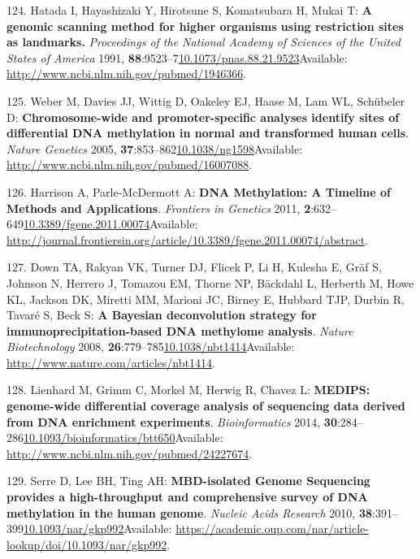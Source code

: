 \documentclass[
]{book}
\begin{document}
\leavevmode\hypertarget{ref-Hatada1991}{}%
124. Hatada I, Hayashizaki Y, Hirotsune S, Komatsubara H, Mukai T: \textbf{A genomic scanning method for higher organisms using restriction sites as landmarks.} \emph{Proceedings of the National Academy of Sciences of the United States of America} 1991, \textbf{88}:9523--7\href{https://doi.org/10.1073/pnas.88.21.9523}{10.1073/pnas.88.21.9523}Available: \url{http://www.ncbi.nlm.nih.gov/pubmed/1946366}.

\leavevmode\hypertarget{ref-Weber2005}{}%
125. Weber M, Davies JJ, Wittig D, Oakeley EJ, Haase M, Lam WL, Schübeler D: \textbf{Chromosome-wide and promoter-specific analyses identify sites of differential DNA methylation in normal and transformed human cells}. \emph{Nature Genetics} 2005, \textbf{37}:853--862\href{https://doi.org/10.1038/ng1598}{10.1038/ng1598}Available: \url{http://www.ncbi.nlm.nih.gov/pubmed/16007088}.

\leavevmode\hypertarget{ref-Harrison2011}{}%
126. Harrison A, Parle-McDermott A: \textbf{DNA Methylation: A Timeline of Methods and Applications}. \emph{Frontiers in Genetics} 2011, \textbf{2}:632--649\href{https://doi.org/10.3389/fgene.2011.00074}{10.3389/fgene.2011.00074}Available: \url{http://journal.frontiersin.org/article/10.3389/fgene.2011.00074/abstract}.

\leavevmode\hypertarget{ref-Down2009}{}%
127. Down TA, Rakyan VK, Turner DJ, Flicek P, Li H, Kulesha E, Gräf S, Johnson N, Herrero J, Tomazou EM, Thorne NP, Bäckdahl L, Herberth M, Howe KL, Jackson DK, Miretti MM, Marioni JC, Birney E, Hubbard TJP, Durbin R, Tavaré S, Beck S: \textbf{A Bayesian deconvolution strategy for immunoprecipitation-based DNA methylome analysis}. \emph{Nature Biotechnology} 2008, \textbf{26}:779--785\href{https://doi.org/10.1038/nbt1414}{10.1038/nbt1414}Available: \url{http://www.nature.com/articles/nbt1414}.

\leavevmode\hypertarget{ref-Lienhard2014}{}%
128. Lienhard M, Grimm C, Morkel M, Herwig R, Chavez L: \textbf{MEDIPS: genome-wide differential coverage analysis of sequencing data derived from DNA enrichment experiments}. \emph{Bioinformatics} 2014, \textbf{30}:284--286\href{https://doi.org/10.1093/bioinformatics/btt650}{10.1093/bioinformatics/btt650}Available: \url{http://www.ncbi.nlm.nih.gov/pubmed/24227674}.

\leavevmode\hypertarget{ref-Serre2009a}{}%
129. Serre D, Lee BH, Ting AH: \textbf{MBD-isolated Genome Sequencing provides a high-throughput and comprehensive survey of DNA methylation in the human genome}. \emph{Nucleic Acids Research} 2010, \textbf{38}:391--399\href{https://doi.org/10.1093/nar/gkp992}{10.1093/nar/gkp992}Available: \url{https://academic.oup.com/nar/article-lookup/doi/10.1093/nar/gkp992}.
\end{document}
